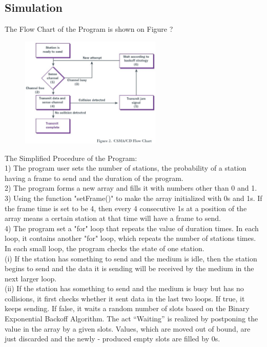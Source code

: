\documentclass[11pt,a4paper]{report}
\begin{document}
\subsection*{Simulation}

The Flow Chart of the Program is shown on Figure ? \\

\begin{figure}
\centering
\includegraphics[width=0.6\textwidth]{4_1.eps}
\end{figure}

The Simplified Procedure of the Program: \\
1) The program user sets the number of stations, the probability of a station having a frame to send and the duration of the program. \\

2) The program forms a new array and fills it with numbers other than 0 and 1. \\

3) Using the function "setFrame()" to make the array initialized with 0s and 1s. If the frame time is set to be 4, then every 4 consecutive 1s at a position of the array means a certain station at that time will have a frame to send. \\

4) The program set a "for" loop that repeats the value of duration times. In each loop, it contains another "for" loop, which repeats the number of stations times. In each small loop, the program checks the state of one station. \\

(i) If the station has something to send and the medium is idle, then the station begins to send and the data it is sending will be received by the medium in the next larger loop. \\


(ii) If the station has something to send and the medium is busy but has no collisions, it first checks whether it sent data in the last two loops. If true, it keeps sending. If false, it waits a random number of slots based on the Binary Exponential Backoff Algorithm. The act “Waiting” is realized by postponing the value in the array by a given slots. Values, which are moved out of bound, are just discarded and the newly - produced empty slots are filled by 0s. \\
\end{document}
